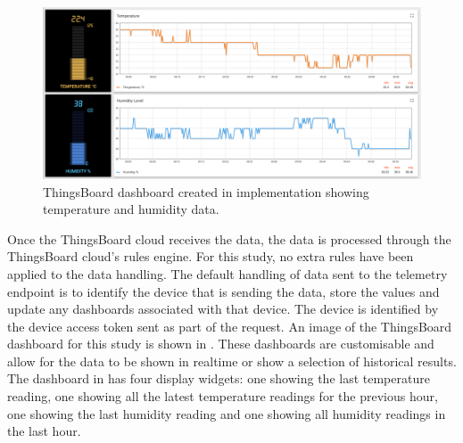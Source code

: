 \begin{figure}[t]
    \includegraphics[width=\textwidth]{assets/thingsboard_dashboard.png}
    \caption{\label{fig:thingsboard_dashboard} ThingsBoard dashboard created in 
    implementation showing temperature and humidity data.}
\end{figure}

Once the ThingsBoard cloud receives the data, the data is processed through the
ThingsBoard cloud's rules engine. For this study, no extra rules have been 
applied to the data handling. The default handling of data sent to the telemetry
endpoint is to identify the device that is sending the data, store the values
and update any dashboards associated with that device. The device is 
identified by the device access token sent as part of the request. An image 
of the ThingsBoard dashboard for this study is shown in 
. These dashboards are customisable and allow
for the data to be shown in realtime or show a selection of historical results.
The dashboard in  has four display widgets:
one showing the last temperature reading, one showing all the latest temperature
readings for the previous hour, one showing the last humidity reading and one
showing all humidity readings in the last hour.
